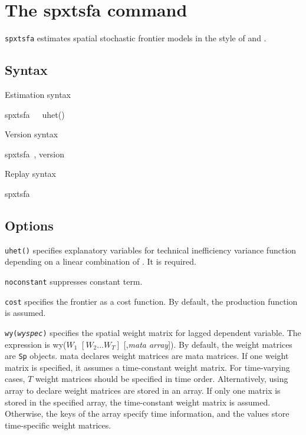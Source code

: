
\section{The spxtsfa command}
{\tt spxtsfa} estimates spatial stochastic frontier models in the style of \cite{orea2019new} and \cite{galli2022spatial}.

\subsection{Syntax}

Estimation syntax

\begin{stsyntax}
	spxtsfa\
    \depvar\
    \optindepvars\,
	uhet(\varlist)
\end{stsyntax}



\noindent Version syntax

\begin{stsyntax}
	spxtsfa\
	, version
\end{stsyntax}


\noindent Replay syntax

\begin{stsyntax}
	spxtsfa\
\end{stsyntax}

\subsection{Options}

\hangpara
{\tt uhet(\varlist)} specifies explanatory variables for technical inefficiency variance  function depending on a linear combination of \varlist. It is required.

\hangpara
{\tt noconstant} suppresses constant term.

\hangpara
{\tt cost} specifies the frontier as a cost function. By default, the production function is assumed.

\hangpara
{\tt wy({\it wyspec})} specifies the spatial weight matrix for lagged dependent variable. The expression is wy($W_1$ $ [W_2 ... W_T]$ [,{\it mata array}]).  By default, the weight matrices are {\tt Sp} objects. mata declares weight matrices are mata matrices. If one weight matrix is specified, it assumes a time-constant weight matrix. For time-varying cases, $T$ weight matrices should be specified in time order. Alternatively, using array to declare weight matrices are stored in an array.  If only one matrix is stored in the specified array, the time-constant weight matrix is assumed.  Otherwise, the keys of the array specify time information, and the values store time-specific weight matrices.

